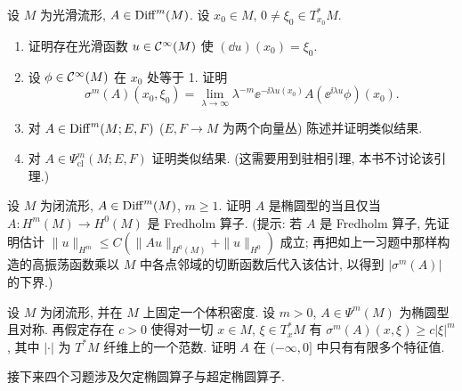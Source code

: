 \begin{exer}[通过振荡测试重构主符号]\label{ex:5.32}
设 $M$ 为光滑流形, $A \in \operatorname{Diff}^m(M)$. 设 $x_0 \in M$, $0 \neq \xi_0 \in T_{x_0}^* M$.
\begin{enumerate}
    \item 证明存在光滑函数 $u \in \mathcal{C}^\infty(M)$ 使 $(\dd u)(x_0) = \xi_0$.
    \item 设 $\phi \in \mathcal{C}^\infty(M)$ 在 $x_0$ 处等于 1. 证明
    \begin{equation}\label{eq:5.232}
        \sigma^m(A)(x_0, \xi_0) = \lim_{\lambda \to \infty} \lambda^{-m} \ee^{-\ii \lambda u(x_0)} A\left( \ee^{\ii \lambda u} \phi \right)(x_0).
    \end{equation}
    \item 对 $A \in \operatorname{Diff}^m(M; E, F)$ ($E, F \to M$ 为两个向量丛) 陈述并证明类似结果.
    \item[$(*)$] 对 $A \in \Psi_{\mathrm{cl}}^m(M; E, F)$ 证明类似结果. (这需要用到驻相引理, 本书不讨论该引理.)
\end{enumerate}
\end{exer}

\begin{exer}\label{ex:5.33}
设 $M$ 为闭流形, $A \in \operatorname{Diff}^m(M)$, $m \ge 1$. 证明 $A$ 是椭圆型的当且仅当 $A \colon H^m(M) \to H^0(M)$ 是 Fredholm 算子. (提示: 若 $A$ 是 Fredholm 算子, 先证明估计 $\|u\|_{H^m} \le C(\|Au\|_{H^0(M)} + \|u\|_{H^0})$ 成立; 再把如上一习题中那样构造的高振荡函数乘以 $M$ 中各点邻域的切断函数后代入该估计, 以得到 $|\sigma^m(A)|$ 的下界.)
\end{exer}

\begin{exer}[符号与谱界]\label{ex:5.34}
设 $M$ 为闭流形, 并在 $M$ 上固定一个体积密度. 设 $m > 0$, $A \in \Psi^m(M)$ 为椭圆型且对称. 再假定存在 $c > 0$ 使得对一切 $x \in M$, $\xi \in T_x^* M$ 有 $\sigma^m(A)(x, \xi) \ge c|\xi|^m$, 其中 $|\cdot|$ 为 $T^* M$ 纤维上的一个范数. 证明 $A$ 在 $(-\infty, 0]$ 中只有有限多个特征值.
\end{exer}

接下来四个习题涉及欠定椭圆算子与超定椭圆算子.

